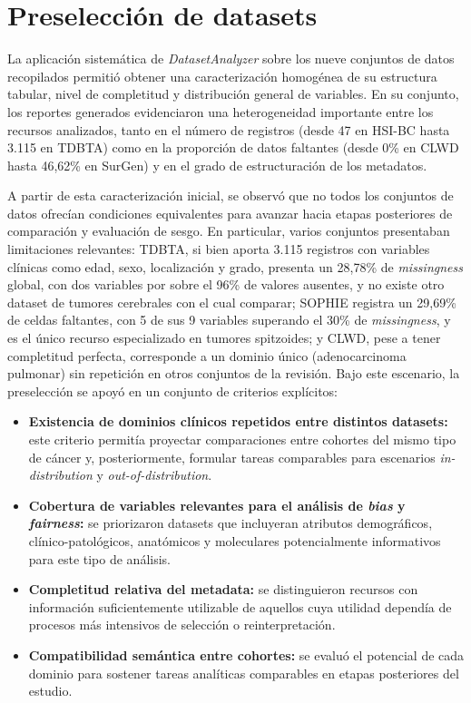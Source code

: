 \section{Preselección de datasets}
\label{sec:preseleccion}

La aplicación sistemática de \textit{DatasetAnalyzer} sobre los nueve conjuntos de datos recopilados permitió obtener una caracterización homogénea de su estructura tabular, nivel de completitud y distribución general de variables. En su conjunto, los reportes generados evidenciaron una heterogeneidad importante entre los recursos analizados, tanto en el número de registros (desde 47 en HSI-BC hasta 3.115 en TDBTA) como en la proporción de datos faltantes (desde 0\% en CLWD hasta 46,62\% en SurGen) y en el grado de estructuración de los metadatos.

A partir de esta caracterización inicial, se observó que no todos los conjuntos de datos ofrecían condiciones equivalentes para avanzar hacia etapas posteriores de comparación y evaluación de sesgo. En particular, varios conjuntos presentaban limitaciones relevantes: TDBTA, si bien aporta 3.115 registros con variables clínicas como edad, sexo, localización y grado, presenta un 28,78\% de \textit{missingness} global, con dos variables por sobre el 96\% de valores ausentes, y no existe otro dataset de tumores cerebrales con el cual comparar; SOPHIE registra un 29,69\% de celdas faltantes, con 5 de sus 9 variables superando el 30\% de \textit{missingness}, y es el único recurso especializado en tumores spitzoides; y CLWD, pese a tener completitud perfecta, corresponde a un dominio único (adenocarcinoma pulmonar) sin repetición en otros conjuntos de la revisión. Bajo este escenario, la preselección se apoyó en un conjunto de criterios explícitos:

\begin{itemize}
    \item \textbf{Existencia de dominios clínicos repetidos entre distintos datasets:} este criterio permitía proyectar comparaciones entre cohortes del mismo tipo de cáncer y, posteriormente, formular tareas comparables para escenarios \textit{in-distribution} y \textit{out-of-distribution}.
    \item \textbf{Cobertura de variables relevantes para el análisis de \textit{bias} y \textit{fairness}:} se priorizaron datasets que incluyeran atributos demográficos, clínico-patológicos, anatómicos y moleculares potencialmente informativos para este tipo de análisis.
    \item \textbf{Completitud relativa del metadata:} se distinguieron recursos con información suficientemente utilizable de aquellos cuya utilidad dependía de procesos más intensivos de selección o reinterpretación.
    \item \textbf{Compatibilidad semántica entre cohortes:} se evaluó el potencial de cada dominio para sostener tareas analíticas comparables en etapas posteriores del estudio.
\end{itemize}

